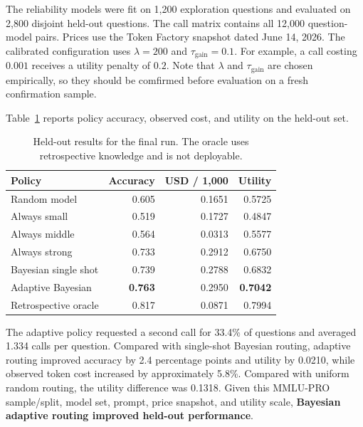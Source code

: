 \documentclass[11pt]{article}
\begin{document}
The reliability models were fit on 1,200 exploration questions and evaluated on 2,800 disjoint held-out questions. The call matrix contains all 12,000 question-model pairs. Prices use the Token Factory snapshot dated June 14, 2026.
The calibrated configuration uses $\lambda=200$ and $\tau_{\mathrm{gain}}=0.1$. For example, a call costing $0.001$ receives a utility penalty of $0.2$.
Note that $\lambda$ and $\tau_{\mathrm{gain}}$ are chosen empirically, so they should be comfirmed before evaluation on a fresh confirmation sample.

Table~\ref{tab:final-results} reports policy accuracy, observed cost, and utility on the held-out set.
\begin{table}[ht]
\centering
\small
\begin{tabular}{lrrr}
\hline
Policy & Accuracy & USD / 1,000 & Utility \\
\hline
Random model & 0.605 & 0.1651 & 0.5725 \\
Always small & 0.519 & 0.1727 & 0.4847 \\
Always middle & 0.564 & 0.0313 & 0.5577 \\
Always strong & 0.733 & 0.2912 & 0.6750 \\
Bayesian single shot & 0.739 & 0.2788 & 0.6832 \\
Adaptive Bayesian & \textbf{0.763} & 0.2950 & \textbf{0.7042} \\
Retrospective oracle & 0.817 & 0.0871 & 0.7994 \\
\hline
\end{tabular}
\caption{Held-out results for the final run. The oracle uses retrospective knowledge and is not deployable.}
\label{tab:final-results}
\end{table}

The adaptive policy requested a second call for 33.4\% of questions and averaged 1.334 calls per question. Compared with single-shot Bayesian routing, adaptive routing improved accuracy by 2.4 percentage points and utility by 0.0210, while observed token cost increased by approximately 5.8\%. Compared with uniform random routing, the utility difference was 0.1318.
Given this MMLU-PRO sample/split, model set, prompt, price snapshot, and utility scale, \textbf{Bayesian adaptive routing improved held-out performance}. 
\end{document}
